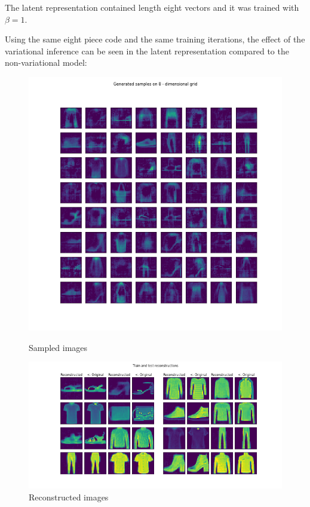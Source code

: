 \documentclass[12pt, english]{article}
\begin{document}
\par The latent representation contained length eight vectors and it was trained with $\beta = 1$.

\vspace{4mm}

\par Using the same eight piece code and the same training iterations, the effect of the variational inference can be seen in the latent representation compared to the non-variational model:

\begin{figure}[ht] 
  \label{fig:auto_encoder_results} 
  \begin{minipage}[b]{0.5\linewidth}
    \centering
    \includegraphics[width=.65\linewidth]{gen/generated_samples_fashion_mnist_auto_encoder.png} 
    \caption{Sampled images} 
  \end{minipage}%
  \begin{minipage}[b]{0.5\linewidth}
    \centering
    \includegraphics[width=.95\linewidth]{reco/reconstrunction_samples_fashion_mnist_auto_encoder.png} 
    \caption{Reconstructed images} 
  \end{minipage} 
\end{figure}
\end{document}
